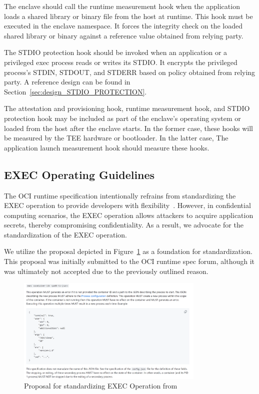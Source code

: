    
  The enclave should call the runtime measurement hook when the application loads a shared library or binary file from the host at runtime. This hook must be executed in the enclave namespace. It forces the integrity check on the loaded shared library or binary against a reference value obtained from relying party.    
   
   
  The STDIO protection hook should be invoked when an application or a privileged exec process reads or writes its STDIO. It encrypts the privileged process's STDIN, STDOUT, and STDERR based on policy obtained from relying party. A reference design can be found in Section~\ref{sec:design_STDIO_PROTECTION}.
   
  The attestation and provisioning hook, runtime measurement hook, and STDIO protection hook may be included as part of the enclave's operating system or loaded from the host after the enclave starts. In the former case, these hooks will be measured by the \acrshort{TEE} hardware or bootloader. In the latter case, The application launch measurement hook should measure 
  these hooks. 
\subsection{EXEC Operating Guidelines}
\label{subsec:oci_exec}
The OCI runtime specification intentionally refrains from standardizing the EXEC operation to provide developers with flexibility~\cite*{exec_semantics}. However, in confidential computing scenarios, the EXEC operation allows attackers to acquire application secrets, thereby compromising confidentiality. As a result, we advocate for the 
standardization of the EXEC operation.
 
We utilize the proposal depicted in Figure~\ref{fig:exec_propose} as a foundation for standardization. This proposal was initially submitted to the OCI runtime spec forum, although it was ultimately not accepted due to the previously outlined reason.
 
\begin{figure}[!htb]
    \centering
    \includegraphics[width=0.8\textwidth]{images/exec_propose.png}
    \caption[Proposal for standardizing EXEC operation]{Proposal for standardizing EXEC Operation from~\cite*{exec_proposal} }
    \label{fig:exec_propose}
\end{figure}
 
